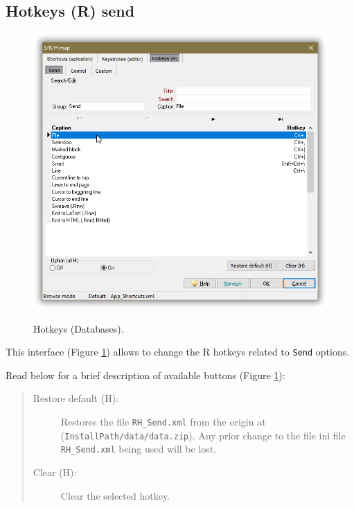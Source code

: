 \subsection{Hotkeys (R) send}

\begin{figure}[H]
  \includegraphics[scale=0.35]{./res/skh_map_rh_send_dlg.png}\\
  \caption{Hotkeys (Databases).}
  \label{fig:rh_send_dlg}
\end{figure}

This interface
(Figure \ref{fig:rh_send_dlg})
allows to change the R hotkeys related to \texttt{Send} options.

Read below for a brief description of available buttons (Figure \ref{fig:rh_send_dlg}):

\begin{quote}
  \begin{footnotesize}
    \begin{description}
      \item[Restore default (H):]
        Restores the file \texttt{RH\_Send.xml} from the origin at
        (\texttt{InstallPath/data/data.zip}). Any prior change to the file ini file
        \texttt{RH\_Send.xml} being used will be lost.
      \item[Clear (H):]
        Clear the selected hotkey.
    \end{description}
  \end{footnotesize}
\end{quote}


